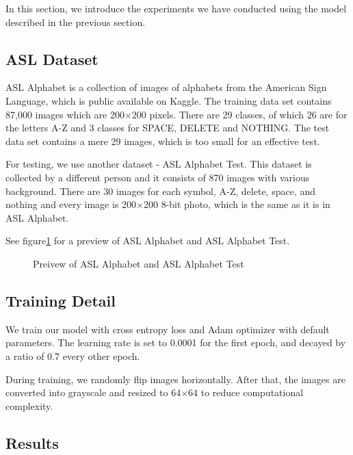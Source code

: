 \documentclass[10pt,twocolumn,letterpaper]{article}
\begin{document}
In this section, we introduce the experiments we have conducted using the model described in the previous section.

\subsection{ASL Dataset}

ASL Alphabet\cite{noauthor_asl_nodate} is a collection of images of alphabets from the American Sign Language, which is public available on Kaggle. The training data set contains 87,000 images which are 200$\times$200 pixels. There are 29 classes, of which 26 are for the letters A-Z and 3 classes for SPACE, DELETE and NOTHING. The test data set contains a mere 29 images, which is too small for an effective test.

For testing, we use another dataset - ASL Alphabet Test\cite{noauthor_asl_nodate-1}. This dataset is collected by a different person and it consists of 870 images with various background. There are 30 images for each symbol, A-Z, delete, space, and nothing and every image is 200$\times$200 8-bit photo, which is the same as it is in ASL Alphabet. 

See figure\ref{fig:asl} for a preview of ASL Alphabet and ASL Alphabet Test.

\begin{figure}[h]
\begin{center}
\fbox{\rule{0pt}{2in} \rule{0.9\linewidth}{0pt}}
\end{center}
 \caption{Preivew of ASL Alphabet and ASL Alphabet Test}
\label{fig:asl}
\end{figure}


\subsection{Training Detail}

We train our model with cross entropy loss and Adam optimizer\cite{kingma2014adam} with default parameters. The learning rate is set to 0.0001 for the first epoch, and decayed by a ratio of 0.7 every other epoch. 

During training, we randomly flip images horizontally. After that, the images are converted into grayscale and resized to 64$\times$64 to reduce computational complexity. 

\subsection{Results}
\end{document}
